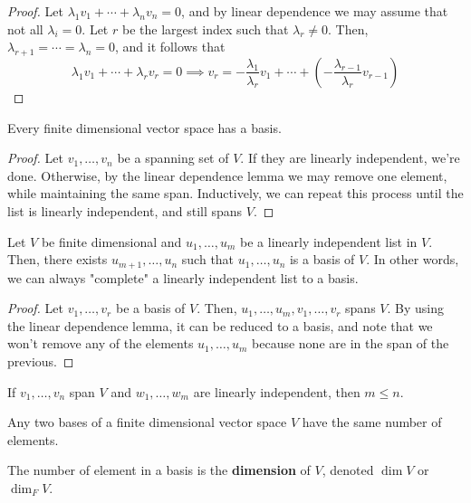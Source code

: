 \begin{proof}
    Let $\lambda_1v_1+\cdots +\lambda_nv_n=0$, and by linear dependence we may assume that not all $\lambda_i=0$. Let $r$ be the largest index such that $\lambda_r \neq 0$. Then, $\lambda_{r+1}=\cdots=\lambda_n=0$, and it follows that
    $$\lambda_1v_1+\cdots +\lambda_rv_r=0 \implies v_r=-\frac{\lambda_1}{\lambda_r}v_1+\cdots +(-\frac{\lambda_{r-1}}{\lambda_r}v_{r-1})$$
\end{proof}

\begin{thm}
    Every finite dimensional vector space has a basis.
\end{thm}

\begin{proof}
    Let $v_1,\dots,v_n$ be a spanning set of $V$. If they are linearly independent, we're done. Otherwise, by the linear dependence lemma we may remove one element, while maintaining the same span. Inductively, we can repeat this process until the list is linearly independent, and still spans $V$.
\end{proof}

\begin{prop}
    Let $V$ be finite dimensional and $u_1,\dots,u_m$ be a linearly independent list in $V$. Then, there exists $u_{m+1},\dots,u_n$ such that $u_1,\dots,u_n$ is a basis of $V$. In other words, we can always "complete" a linearly independent list to a basis.
\end{prop}

\begin{proof}
    Let $v_1,\dots,v_r$ be a basis of $V$. Then, $u_1,\dots,u_m,v_1,\dots,v_r$ spans $V$. By using the linear dependence lemma, it can be reduced to a basis, and note that we won't remove any of the elements $u_1,\dots,u_m$ because none are in the span of the previous.
\end{proof}

\begin{prop}
    If $v_1,\dots,v_n$ span $V$ and $w_1,\dots,w_m$ are linearly independent, then $m \leq n$.
\end{prop}

\begin{cor}
    Any two bases of a finite dimensional vector space $V$ have the same number of elements.
\end{cor}

\begin{defn}
    The number of element in a basis is the \textbf{dimension} of $V$, denoted $\dim V$ or $\dim _FV$.
\end{defn}

